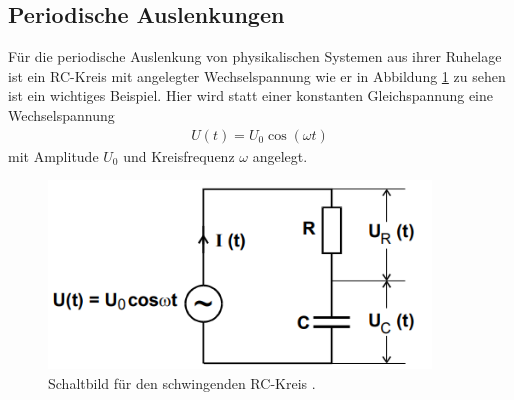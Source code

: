 \subsection{Periodische Auslenkungen}
Für die periodische Auslenkung von physikalischen Systemen aus ihrer Ruhelage ist ein RC-Kreis mit angelegter Wechselspannung
wie er in Abbildung \ref{fig:schwingend} zu sehen ist ein wichtiges Beispiel.
Hier wird statt einer konstanten Gleichspannung eine Wechselspannung 
\begin{align}
    U(t) = U_0 \cos(\omega t)
\end{align}
mit Amplitude $U_0$ und Kreisfrequenz $\omega$ angelegt. 
\begin{figure}[H]
    \centering
    \includegraphics[height=5cm]{abbildungen/oszillatorisch.png}
    \caption{Schaltbild für den schwingenden RC-Kreis \cite{man:v353}.}
    \label{fig:schwingend}
\end{figure}